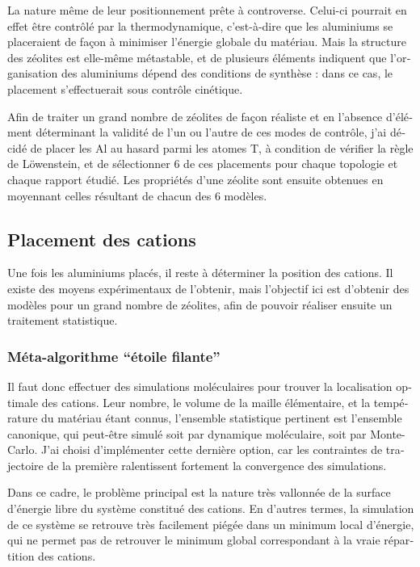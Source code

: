 \documentclass[thesis]{subfiles}
\begin{document}
\begin{otherlanguage}{french}
La nature même de leur positionnement prête à controverse. Celui-ci pourrait en effet être contrôlé par la thermodynamique, c'est-à-dire que les aluminiums se placeraient de façon à minimiser l'énergie globale du matériau. Mais la structure des zéolites est elle-même métastable, et de plusieurs éléments indiquent que l'organisation des aluminiums dépend des conditions de synthèse : dans ce cas, le placement s'effectuerait sous contrôle cinétique.

Afin de traiter un grand nombre de zéolites de façon réaliste et en l'absence d'élément déterminant la validité de l'un ou l'autre de ces modes de contrôle, j'ai décidé de placer les Al au hasard parmi les atomes T, à condition de vérifier la règle de L\"owenstein, et de sélectionner 6 de ces placements pour chaque topologie et chaque rapport \SiAl étudié. Les propriétés d'une zéolite sont ensuite obtenues en moyennant celles résultant de chacun des 6 modèles.

\subsection{Placement des cations}

Une fois les aluminiums placés, il reste à déterminer la position des cations. Il existe des moyens expérimentaux de l'obtenir, mais l'objectif ici est d'obtenir des modèles pour un grand nombre de zéolites, afin de pouvoir réaliser ensuite un traitement statistique.

\subsubsection{Méta-algorithme ``étoile filante''}

Il faut donc effectuer des simulations moléculaires pour trouver la localisation optimale des cations. Leur nombre, le volume de la maille élémentaire, et la température du matériau étant connus, l'ensemble statistique pertinent est l'ensemble canonique, qui peut-être simulé soit par dynamique moléculaire, soit par Monte-Carlo. J'ai choisi d'implémenter cette dernière option, car les contraintes de trajectoire de la première ralentissent fortement la convergence des simulations.

Dans ce cadre, le problème principal est la nature très vallonnée de la surface d'énergie libre du système constitué des cations. En d'autres termes, la simulation de ce système se retrouve très facilement piégée dans un minimum local d'énergie, qui ne permet pas de retrouver le minimum global correspondant à la vraie répartition des cations.


\end{otherlanguage}
\end{document}
